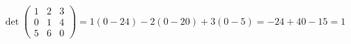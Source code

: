 \documentclass{article}
\begin{document}
\[
\det\begin{pmatrix} 1 & 2 & 3 \\ 0 & 1 & 4 \\ 5 & 6 & 0 \end{pmatrix}
  = 1(0-24) - 2(0-20) + 3(0-5) = -24 + 40 - 15 = 1
\]
\end{document}
